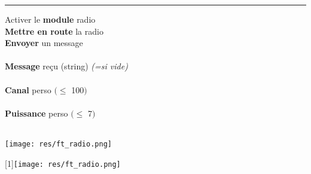 \begin{minipage}{0.7\linewidth}
	\begin{methode}[Radio]
		\rule{-0.25em}{2em}
		Activer le \textbf{module} radio
		\hfill {}\\
		
		\textbf{Mettre en route} la radio
		\hfill {}\\
		
		\textbf{Envoyer} un message
		\hfill {}\\
		\hfill \ex {}\\
		
		\textbf{Message} reçu (string) 
		\textit{\footnotesize (=si vide)}
		\hfill {}\\
		\hfill \ex {}\\
		
		\textbf{Canal} perso $(\leq$ 100$\big )$
		\hfill {}\\	
		\hfill \ex {}\\
		
		\textbf{Puissance} perso $(\leq$ 7$\big )$
		\hfill {}\\
		\hfill \ex {}\\
	\end{methode}
\end{minipage}
\hfill
\begin{minipage}{0.3\linewidth}
	\begin{center}
		\texttt{[image: res/ft\_radio.png]}\\
	\end{center}
	\hfill \scalebox{-1}[1]{\texttt{[image: res/ft\_radio.png]}}
\end{minipage}




